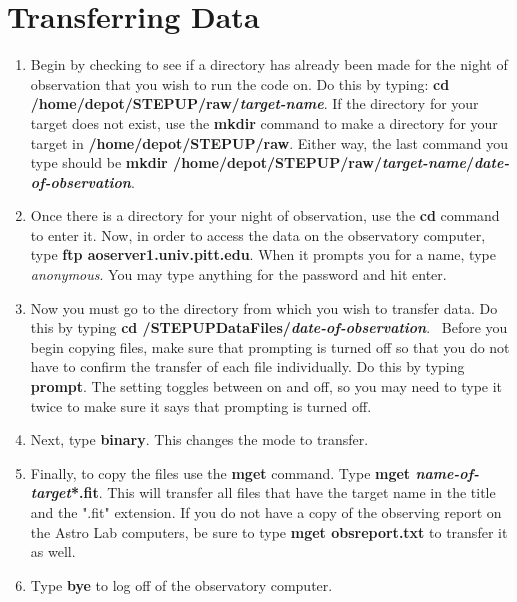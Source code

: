 \documentclass[11pt]{report}
\begin{document}
\section{Transferring Data}

\begin{enumerate}
\item Begin by checking to see if a directory has already been made for the night of observation that you wish to run the code on. Do this by typing: {\bf cd /home/depot/STEPUP/raw/\emph{target-name}}. If the directory for your target does not exist, use the {\bf mkdir} command to make a directory for your target in {\bf /home/depot/STEPUP/raw}. Either way, the last command you type should be {\bf mkdir /home/depot/STEPUP/raw/\emph{target-name}/\emph{date-of-observation}}. 
\item Once there is a directory for your night of observation, use the {\bf cd} command to enter it. Now, in order to access the data on the observatory computer, type {\bf ftp aoserver1.univ.pitt.edu}. When it prompts you for a name, type \emph{anonymous}. You may type anything for the password and hit enter.
\item Now you must go to the directory from which you wish to transfer data. Do this by typing {\bf cd /STEPUPDataFiles/\emph{date-of-observation}}.
\ Before you begin copying files, make sure that prompting is turned off so that you do not have to confirm the transfer of each file individually. Do this by typing {\bf prompt}. The setting toggles between on and off, so you may need to type it twice to make sure it says that prompting is turned off.
\item Next, type {\bf binary}. This changes the mode to transfer.
\item Finally, to copy the files use the {\bf mget} command. Type {\bf mget \emph{name-of-target}*.fit}. This will transfer all files that have the target name in the title and the ".fit" extension. If you do not have a copy of the observing report on the Astro Lab computers, be sure to type {\bf mget obsreport.txt} to transfer it as well. 
\item Type {\bf bye} to log off of the observatory computer.
\end{enumerate}
\end{document}
